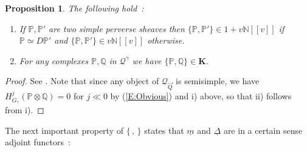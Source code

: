 \documentclass[a4paper,10pt]{amsart}
\def\N{\mathbb{N}}
\def\QQ{\mathcal{Q}_{\vec{Q}}}
\newtheorem{prop}[theo]{Proposition}
\numberwithin{equation}{section}
\begin{document}
\vspace{.1in}

\begin{prop}\label{C:scalarprod} The following hold~:
\begin{enumerate}
\item[i)] If $\mathbb{P}, \mathbb{P}'$ are two simple perverse sheaves then $\{ \mathbb{P},\mathbb{P}'\} \in 1+v\N[[v]]$ if $\mathbb{P} \simeq D \mathbb{P}'$ and $\{\mathbb{P}, \mathbb{P}'\} \in v \N[[v]]$ otherwise.
\item[ii)] For any complexes $\mathbb{P}, \mathbb{Q}$ in $\mathcal{Q}^{\gamma}$ we have $\{\mathbb{P}, \mathbb{Q}\} \in \mathbf{K}$.
\end{enumerate}
\end{prop}
\begin{proof} See \cite{GL}. Note that since any object of $\QQ$ is semisimple, we have $H^j_{G_{\gamma}}(\mathbb{P} \otimes \mathbb{Q}) =0$ for $j \ll 0$ by (\ref{E:Obvious}) and i) above, so that ii) follows from i). \end{proof}
\vspace{.1in}

The next important property of $\{\,,\,\}$ states that $\underline{m}$ and $\underline{\Delta}$ are in a certain sense adjoint functors~:

\vspace{.1in}
\end{document}
